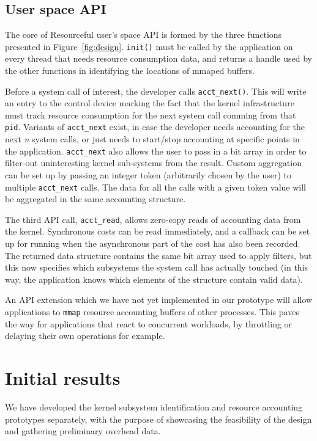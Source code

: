 \documentclass[12pt,twoside,a4paper]{article}
\newcommand{\pname}{Resourceful}
\begin{document}

\subsection{User space API}
The core of \pname{ }user's space API is formed by the three functions presented
in Figure~\ref{fig:design}. \texttt{init()} must be called by the application on
every thread that needs resource consumption data, and returns a handle used by
the other functions in identifying the locations of mmaped buffers. 

Before a system call of interest, the developer calls
\texttt{acct\_next()}. This will write an entry to the control device marking
the fact that the kernel infrastructure must track resource consumption for the
next system call comming from that \texttt{pid}. Variants of
\texttt{acct\_next} exist, in case the developer needs accounting for the next
\textit{n} system calls, or just needs to start/stop accounting at specific
points in the application. \texttt{acct\_next} also allows the user to pass in a
bit array in order to filter-out uninteresting kernel sub-systems from the
result. Custom aggregation can be set up by passing an integer token
(arbitrarily chosen by the user) to multiple \texttt{acct\_next} calls. The data
for all the calls with a given token value will be aggregated in the same
accounting structure.

The third API call, \texttt{acct\_read}, allows zero-copy reads of accounting
data from the kernel. Synchronous costs can be read immediately, and a callback
can be set up for running when the asynchronous part of the cost has also been
recorded. The returned data structure contains the same bit array used to apply
filters, but this now specifies which subsystems the system call has actually touched
(in this way, the application knows which elements of the structure contain valid data).

An API extension which we have not yet implemented in our prototype will allow applications
to \texttt{mmap} resource accounting buffers of other processes. This paves the way for applications that
react to concurrent workloads, by throttling or delaying their own
operations for example.

\section{Initial results}
We have developed the kernel subsystem identification and resource accounting
prototypes separately, with the purpose of showcasing the feasibility of the design
and gathering preliminary overhead data.
\end{document}
